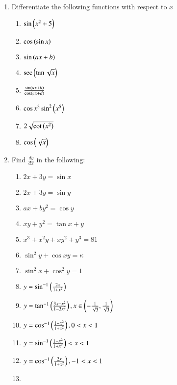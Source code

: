 \begin{enumerate}[label=\arabic*.,ref=\thesubsection.\theenumi]
\item Differentiate the following functions with respect to $x$
%
\begin{enumerate}
\item 
$
\sin \left(x^2+5\right)
$
\item 
$
\cos \left(\sin x\right)
$
\item 
$
 \sin\left(ax+b\right)
$
\item 
$
\sec \left(\tan \sqrt{x}\right)
$
\item 
$
\frac{\sin \left(ax+b\right)}{\cos \left( cx+d\right)}
$
\item 
$
\cos x^3 \sin^2\left(x^5\right)
$
\item 
$
2\sqrt{\cot \left(x^2\right)}
$
\item 
$
\cos\left(\sqrt{x}\right)
$
\end{enumerate}
\item Find $\frac{dy}{dx}$ in the following:
\begin{enumerate}
\item 
$
2x+3y = \sin x
$
\item 
$
2x+3y = \sin y
$
\item 
$
ax + by^2 = \cos y
$
\item 
$
xy+y^2 = \tan x + y
$
\item 
$
x^3+x^2y+xy^2+y^3 = 81
$
\item 
$
\sin^2 y + \cos xy = \kappa
$
\item 
$
\sin ^2 x + \cos ^2 y = 1
$
\item 
$
y = \sin^{-1}\left(\frac{2x}{1+x^2}\right)
$
\item 
$
y = \tan^{-1}\left(\frac{3x-x^2}{1-3x^2}\right), x \in \left(-\frac{1}{\sqrt{3}}, \frac{1}{\sqrt{3}}\right)
$
\item 
$
y = \cos^{-1}\left(\frac{1-x^2}{1+x^2}\right), 0 < x < 1
$
\item 
$
y = \sin^{-1}\left(\frac{1-x^2}{1+x^2}\right)  < x < 1
$
\item 
$
y = \cos^{-1}\left(\frac{2x}{1+x^2}\right), - 1 < x < 1
$
\item 

\end{enumerate}
\end{enumerate}
